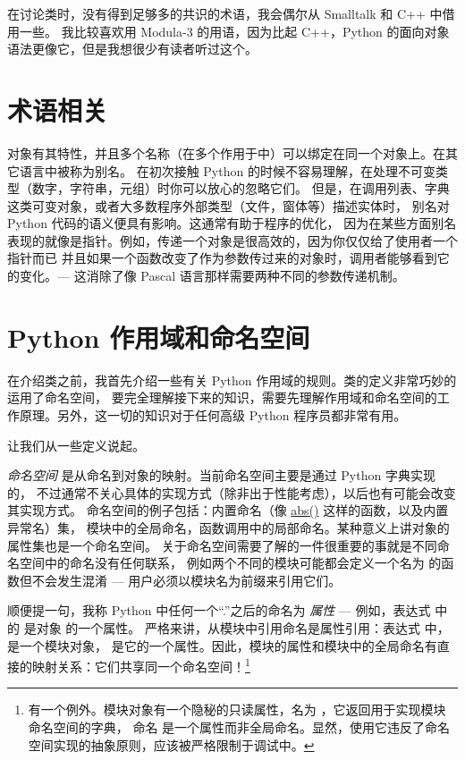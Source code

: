 \documentclass[a4paper,10pt,english]{sphinxmanual}
\begin{document}
在讨论类时，没有得到足够多的共识的术语，我会偶尔从 Smalltalk 和 C++ 中借用一些。
我比较喜欢用 Modula-3 的用语，因为比起 C++，Python 的面向对象语法更像它，但是我想很少有读者听过这个。


\section{术语相关}
\label{classes:tut-object}\label{classes:id2}
对象有其特性，并且多个名称（在多个作用于中）可以绑定在同一个对象上。在其它语言中被称为别名。
在初次接触 Python 的时候不容易理解，在处理不可变类型（数字，字符串，元组）时你可以放心的忽略它们。
但是，在调用列表、字典这类可变对象，或者大多数程序外部类型（文件，窗体等）描述实体时，
别名对 Python 代码的语义便具有影响。这通常有助于程序的优化，
因为在某些方面别名表现的就像是指针。例如，传递一个对象是很高效的，因为你仅仅给了使用者一个指针而已
并且如果一个函数改变了作为参数传过来的对象时，调用者能够看到它的变化。--- 这消除了像 Pascal
语言那样需要两种不同的参数传递机制。


\section{Python 作用域和命名空间}
\label{classes:tut-scopes}\label{classes:python}
在介绍类之前，我首先介绍一些有关 Python 作用域的规则。类的定义非常巧妙的运用了命名空间，
要完全理解接下来的知识，需要先理解作用域和命名空间的工作原理。另外，这一切的知识对于任何高级 Python 程序员都非常有用。

让我们从一些定义说起。

\emph{命名空间} 是从命名到对象的映射。当前命名空间主要是通过 Python 字典实现的，
不过通常不关心具体的实现方式（除非出于性能考虑），以后也有可能会改变其实现方式。
命名空间的例子包括：内置命名（像 \href{https://docs.python.org/3/library/functions.html\#abs}{abs()} 这样的函数，以及内置异常名）集，
模块中的全局命名，函数调用中的局部命名。某种意义上讲对象的属性集也是一个命名空间。
关于命名空间需要了解的一件很重要的事就是不同命名空间中的命名没有任何联系，
例如两个不同的模块可能都会定义一个名为  的函数但不会发生混淆 --- 用户必须以模块名为前缀来引用它们。

顺便提一句，我称 Python 中任何一个“.”之后的命名为 \emph{属性} --- 例如，表达式  中的  是对象  的一个属性。
严格来讲，从模块中引用命名是属性引用：表达式  中， 是一个模块对象，
 是它的一个属性。因此，模块的属性和模块中的全局命名有直接的映射关系：它们共享同一个命名空间！\footnote{
有一个例外。模块对象有一个隐秘的只读属性，名为  ，它返回用于实现模块命名空间的字典，
命名   是一个属性而非全局命名。显然，使用它违反了命名空间实现的抽象原则，应该被严格限制于调试中。
}
\end{document}
